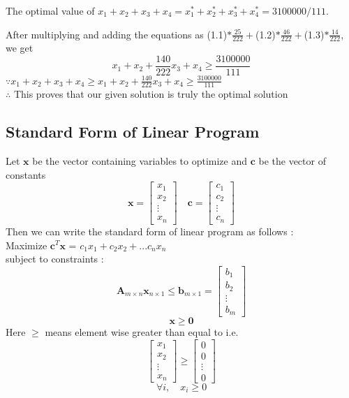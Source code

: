 \documentclass[twoside]{article}
\begin{document}
The optimal value of
$x_1 + x_2 + x_3 + x_4 = x_1^* + x_2^* + x_3^* + x_4^* = 3100000/111.$

After multiplying and adding the equations as (1.1)$*\frac{25}{222}+$(1.2)$*\frac{46}{222}+$(1.3)$*\frac{14}{222}$, we get
\begin{equation}
        x_1+x_2+\frac{140}{222}x_3+x_4 \geq \frac{3100000}{111}
\end{equation}
$\because x_1+x_2+x_3+x_4 \geq x_1+x_2+\frac{140}{222}x_3+x_4 \geq \frac{3100000}{111}$
\\ $\therefore$ This proves that our given solution is truly the optimal solution

\subsection{Standard Form of Linear Program}
Let $\mathbf{x}$ be the vector containing variables to optimize and $\mathbf{c}$ be the vector of constants
\[
\mathbf{x} = \begin{bmatrix}
x_1 \\
x_2 \\
\vdots \\
x_n
\end{bmatrix}
\quad
\mathbf{c} = \begin{bmatrix}
c_1 \\
c_2 \\
\vdots \\
c_n
\end{bmatrix}
\]
Then we can write the standard form of linear program as follows :\\
Maximize $\mathbf{c}^T \mathbf{x}$ = $c_1x_1 + c_2x_2 + ...c_nx_n$\\
subject to constraints :
\[
\mathbf{A}_{m \times n} \mathbf{x}_{n \times 1} \leq \mathbf{b}_{m \times 1} =
\begin{bmatrix}
  b_1 \\
  b_2 \\
  \vdots \\
  b_m
\end{bmatrix}
\]
\[ \mathbf{x} \geq \mathbf{0} \]
Here $\geq$ means element wise greater than equal to i.e.\\
\[
\begin{bmatrix}
  x_1 \\
  x_2 \\
  \vdots \\
  x_n
\end{bmatrix}
\geq
\begin{bmatrix}
  0 \\
  0 \\
  \vdots \\
  0
\end{bmatrix}
\]
\[
\forall i, \quad x_i \geq 0
\]
\end{document}
